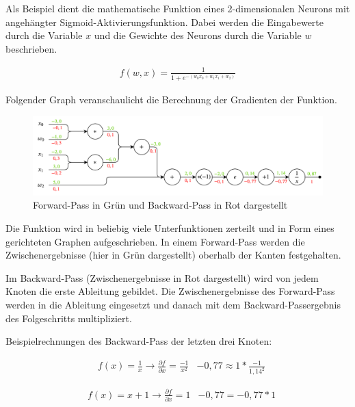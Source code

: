 Als Beispiel dient die mathematische Funktion eines 2-dimensionalen Neurons mit angehängter Sigmoid-Aktivierungsfunktion. Dabei werden die Eingabewerte durch die Variable $ x $ und die Gewichte des Neurons durch die Variable $ w $ beschrieben.

\begin{align}
	f(w, x) = \frac{1}{ 1 + e^{ - (w_{0}x_{0} + w_{1}x_{1} + w_{2}) } }
\end{align}

\pagebreak

Folgender Graph veranschaulicht die Berechnung der Gradienten der Funktion.

\begin{figure}[H]
	\centering
	\includegraphics[width=1\textwidth]{resources/content/backpropagation.png}
	\caption{Forward-Pass in Grün und Backward-Pass in Rot dargestellt \cite{cs231n2}}
	\label{img:backpropagation_img}
\end{figure}

Die Funktion wird in beliebig viele Unterfunktionen zerteilt und in Form eines gerichteten Graphen aufgeschrieben.
In einem Forward-Pass werden die Zwischenergebnisse (hier in Grün dargestellt) oberhalb der Kanten festgehalten.

Im Backward-Pass (Zwischenergebnisse in Rot dargestellt) wird von jedem Knoten die erste Ableitung gebildet. Die Zwischenergebnisse des Forward-Pass werden in die Ableitung eingesetzt und danach mit dem Backward-Passergebnis des Folgeschritts multipliziert.

Beispielrechnungen des Backward-Pass der letzten drei Knoten: 

\begin{align}
	& f(x) = \frac{1}{x} \rightarrow \frac{\partial f}{\partial x} = \frac{-1}{ x^{2} }
	& -0,77 \approx 1 * \frac{-1}{ 1,14^{2} }
\end{align}

\begin{align}
	& f(x) = x + 1 \rightarrow \frac{\partial f}{\partial x} = 1
	& -0,77 = -0,77 * 1
\end{align}

